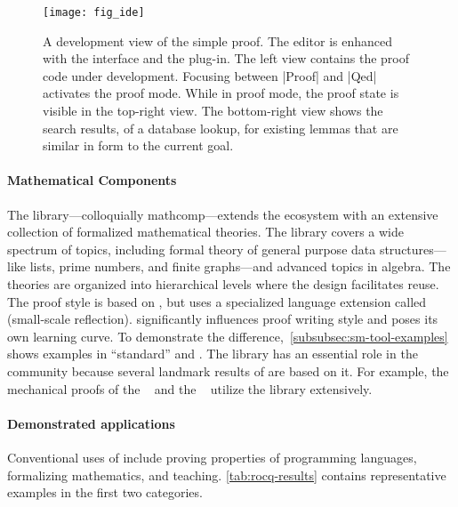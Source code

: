 \begin{figure}[ht]
\begin{center}
\texttt{[image: fig\_ide]}
\end{center}
\caption[Development view of the simple Rocq proof]{
A development view of the simple  proof. The  editor is
enhanced with the \href{https://proofgeneral.github.io/}{}
interface and the
\href{https://github.com/cpitclaudel/company-coq}{} plug-in.
The left view contains the proof code under development. Focusing between
\pr|Proof| and \pr|Qed| activates the {proof mode}. While in proof mode, the
proof state is visible in the top-right view. The bottom-right view shows the
search results, of a database lookup, for existing lemmas that are similar
in form to the current goal.}
\label{fig:rocq-use}
\end{figure}

\paragraph*{Mathematical Components}
The  library---colloquially mathcomp---extends the
 ecosystem with an extensive collection of formalized mathematical
theories. The library covers a wide spectrum of topics, including formal theory
of general purpose data structures---like lists, prime numbers, and finite
graphs---and advanced topics in algebra. The theories are organized into
hierarchical levels where the design facilitates reuse. The proof style is based
on , but  uses a specialized language
extension called  (small-scale reflection). 
significantly influences proof writing style and poses its own learning curve.
To demonstrate the difference,~\autoref{subsubsec:sm-tool-examples} shows
examples in \enquote{standard}  and . The
 library has an essential role in the 
community because several landmark results of  are
based on it. For example, the mechanical proofs of the ~\cite{gonthier2008} and the ~\cite{gonthier2013}
utilize the library extensively.

\paragraph*{Demonstrated applications}
Conventional uses of  include proving properties of programming
languages, formalizing mathematics, and teaching. \autoref{tab:rocq-results}
contains representative examples in the first two categories.

